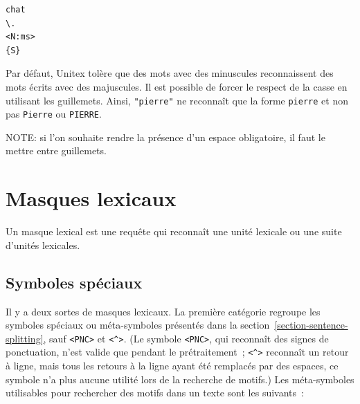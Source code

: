 \begin{verbatim}
chat
\.
<N:ms>
{S}
\end{verbatim}

\noindent Par défaut, Unitex tolère que des mots avec des minuscules reconnaissent des mots écrits
avec des majuscules. Il est possible de forcer le respect de la casse en utilisant les guillemets.
Ainsi, \verb+"pierre"+ ne reconnaît que la forme \verb+pierre+ et non pas \verb+Pierre+ ou \verb+PIERRE+.

\bigskip
\noindent NOTE: si l’on souhaite rendre la présence d’un espace obligatoire, il faut le mettre entre
guillemets.



\section{Masques lexicaux}
Un masque lexical est une requête qui reconnaît une unité lexicale ou une suite d'unités lexicales.

\subsection{Symboles spéciaux}
\label{section-special-symbols}

Il y a deux sortes de masques lexicaux. La première catégorie regroupe les symboles spéciaux ou méta-symboles
présentés dans la
section~\ref{section-sentence-splitting}, sauf \verb$<PNC>$ et  \verb+<^>+. (Le symbole \verb$<PNC>$,
qui reconnaît des signes de ponctuation, n'est valide que pendant le prétraitement~; \verb+<^>+ reconnaît
un retour à ligne, mais tous les retours à la ligne
ayant été remplacés par des espaces, ce symbole n’a plus aucune utilité lors de la recherche de
motifs.) Les méta-symboles utilisables pour rechercher des motifs dans un texte sont les suivants~:

